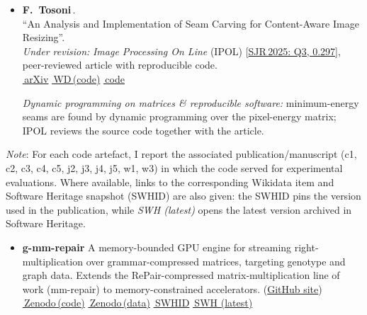 \documentclass[10pt,a4paper,ragged2e,academicons]{altacv}
\newif\ifshortcv
\newcommand{\Larxiv}[1]{\href{https://arxiv.org/abs/#1}{\faScroll\,arXiv}}
\newcommand{\Lzenodo}[2]{\href{#2}{\faArchive\,Zenodo\,(#1)}}
\newcommand{\Lwdcode}[1]{\href{https://www.wikidata.org/wiki/#1}{\faDatabase\,WD\,(code)}}
\newcommand{\Lgh}[1]{\href{#1}{\faGithub\,code}}
\newcommand{\Lswhid}[1]{\href{https://archive.softwareheritage.org/#1}{\faFingerprint\,SWHID}}
\newcommand{\Lswhlatest}[1]{\href{https://archive.softwareheritage.org/browse/origin/directory/?origin_url=#1}{\faFingerprint\,SWH (latest)}}%
\newcommand{\Lsjr}[3]{[\href{https://www.scimagojr.com/journalsearch.php?q=#1&tip=sid}{SJR\,2025: #2, #3}]}
\newcommand{\Lsep}{\;\textcolor{body!40}{\textbullet}\;}
\newcommand{\focusgroup}[1]{\par\smallskip{\small\bfseries\textcolor{accent}{#1}}\par\smallskip}
\newcommand{\pubcaption}[2]{\par\textit{#1:} #2\par\smallskip}
\newcommand{\corr}{\,{\footnotesize\faEnvelope[regular]}}
\newcommand{\pubtag}[2]{{\setlength{\fboxsep}{1.6pt}\colorbox{Pub#1}{\textcolor{white}{\footnotesize\bfseries\strut#1#2}}}}
\newenvironment{publist}{\begin{itemize}[leftmargin=2.6em, labelsep=0.6em, align=left]\sloppy}{\end{itemize}}
\newenvironment{artefactlist}{\begin{itemize}[leftmargin=4.6em, labelsep=0.6em]}{\end{itemize}}
\begin{document}
\begin{paracol}{1}
\begin{publist}
  \item[\pubtag{w}{1}]
  \textbf{F.~Tosoni}\corr. \\
  ``An Analysis and Implementation of Seam Carving for Content-Aware Image Resizing''. \\
  \textit{Under revision:} \textit{Image Processing On Line} (IPOL) \Lsjr{21100824667}{Q3}{0.297}, peer-reviewed article with reproducible code. \\
  \Larxiv{2608.04329} \Lsep \Lwdcode{Q141435187} \Lsep \Lgh{https://github.com/ftosoni/seam-carving}
  \pubcaption{Dynamic programming on matrices \& reproducible software}{minimum-energy seams are found by dynamic programming over the pixel-energy matrix; IPOL reviews the source code together with the article.}

\end{publist}

\smallskip

\ifshortcv\else
{}

{\em Note}: For each code artefact, I report the associated publication/manuscript (c1, c2, c3, c4, c5, j2, j3, j4, j5, w1, w3) in which the code served for experimental evaluations. Where available, links to the corresponding Wikidata item and Software Heritage snapshot (SWHID) are also given: the SWHID pins the version used in the publication, while \emph{SWH (latest)} opens the latest version archived in Software Heritage.

\divider


\focusgroup{Lossless compression \& compressed data structures}

\begin{artefactlist}

    \item[\pubtag{c}{5}] \textbf{g-mm-repair} \href{https://github.com/ftosoni/g-mm-repair}{\faGithub} A memory-bounded GPU engine for streaming right-multiplication over grammar-compressed matrices, targeting genotype and graph data. Extends the RePair-compressed matrix-multiplication line of work (mm-repair) to memory-constrained accelerators. (\href{https://github.com/ftosoni/g-mm-repair}{GitHub site})\\
    \Lzenodo{code}{https://doi.org/10.5281/zenodo.23139247} \Lsep \Lzenodo{data}{https://doi.org/10.5281/zenodo.22677746} \Lsep \Lswhid{swh:1:dir:b3ac33f72dfebd25b447c18a1b149eedb127fff5} \Lsep \Lswhlatest{https://github.com/ftosoni/g-mm-repair}


\end{artefactlist}
\end{paracol}
\end{document}
